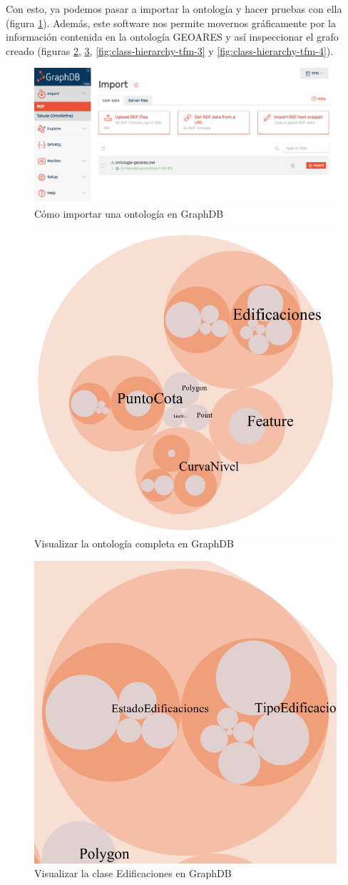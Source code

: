 Con esto, ya podemos pasar a importar la ontología y hacer pruebas con ella (figura \ref{fig:import-owl}). Además, este software nos permite movernos gráficamente por la información contenida en la ontología GEOARES y así inspeccionar el grafo creado (figuras \ref{fig:class-hierarchy-tfm}, \ref{fig:class-hierarchy-tfm-2}, \ref{fig:class-hierarchy-tfm-3} y \ref{fig:class-hierarchy-tfm-4}).

\begin{figure}[H]
	\centering
	\includegraphics[width=0.9\linewidth]{imagenes/capitulo5/import-owl}
	\caption{Cómo importar una ontología en GraphDB}
	\label{fig:import-owl}
\end{figure}


\begin{figure}[H]
	\centering
	\includegraphics[width=0.4\linewidth]{imagenes/capitulo5/class-hierarchy-TFM}
	\caption{Visualizar la ontología completa en GraphDB}
	\label{fig:class-hierarchy-tfm}
\end{figure}


\begin{figure}[H]
	\centering
	\includegraphics[width=0.4\linewidth]{imagenes/capitulo5/class-hierarchy-TFM-2}
	\caption{Visualizar la clase Edificaciones en GraphDB}
	\label{fig:class-hierarchy-tfm-2}
\end{figure}

